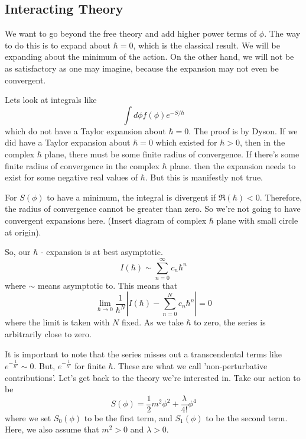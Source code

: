 \documentclass[11pt, oneside]{article}   	%
\theoremstyle{slanted}
\begin{document}
\subsection{Interacting Theory}
We want to go beyond 
the free theory and add higher power terms 
of $ \phi $. The way 
to do this is 
to expand about $ \hbar  =0 $, which is the classical 
result. 
We will be expanding about the minimum of the action. 
On the other hand, we will not 
be as satisfactory as one may imagine, 
because the expansion may not even be convergent. 

Lets look at integrals like 
\[
	\int d \phi f \left( \phi  \right)  e ^{  - S / \hbar}
\] which do not have a Taylor expansion 
about $ \hbar   = 0 $. 
The proof is by Dyson. 
If we did have a Taylor expansion about $ \hbar  =  0 $ which 
existed for $ \hbar > 0 $,
then in the complex $ \hbar $ plane, there must be  
some finite radius of convergence. 
If there's some finite radius of convergence in 
the complex $ \hbar $ plane. 
then the expansion needs to exist 
for some negative real values of $ \hbar $. 
But this is manifestly not true. 

For $ S ( \phi  )$ to have a minimum, the integral 
is divergent if  $ \Re\left( \hbar  \right)  < 0 $. 
Therefore, the radius of convergence 
cannot be greater than zero. 
So we're not going to have convergent expansions 
here. 
(Insert diagram of complex $ \hbar$ plane with small circle 
at origin). 

So, our $ \hbar $  - expansion is at best asymptotic. 
\[
 I \left( \hbar  \right)  \sim \sum_{ n = 0 } ^{ \infty } c _ n \hbar ^  n 
\] where $ \sim $ means asymptotic to. 
This means that 
\[
	\lim _{ \hbar \to 0 } \frac{1}{ \hbar^ N  } | I \left( \hbar  \right)  
	 - \sum_{ n = 0 } ^ N c _ n \hbar ^ n | = 0 
 \]  where the limit is taken with $ N $ fixed. 
 As we take $ \hbar$ to zero, the series
 is arbitrarily close to zero. 

 It is important to note that 
 the series misses out a transcendental terms 
 like $ e^{  - \frac{1}{\hbar ^ 2 } } \sim 0  $. 
 But, $ e ^{  - \frac{1}{\hbar ^ 2 } } $ for finite $ \hbar$. 
 These are what we call 'non-perturbative contributions'. 
Let's get 
back to the theory we're interested in. 
Take our action to be 
\[
 S \left( \phi  \right)   = \frac{1}{2 } m ^ 2 \phi ^ 2 + \frac{\lambda }{ 4 ! } \phi ^ 4 
\] where we set $ S_ 0 \left( \phi  \right)  $ to be the first term, 
and $ S _ 1 \left( \phi  \right)  $ to be the second term. 
Here, we also assume that $ m ^ 2 > 0 $ and $ \lambda > 0 $. 
\end{document}
